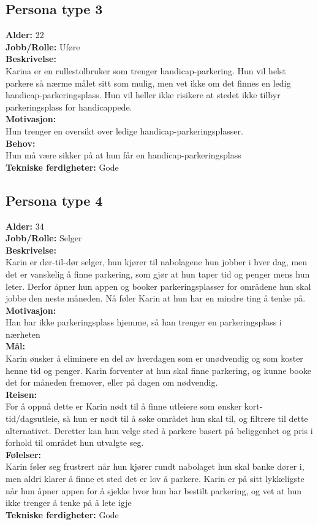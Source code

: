 \documentclass[12pt]{article}
\begin{document}
    \subsection{Persona type 3}
    \textbf{Alder:} 22\\
    \textbf{Jobb/Rolle:} Uføre\\
    \textbf{Beskrivelse:}\\
    Karina er en rullestolbruker som trenger handicap-parkering. Hun vil helst parkere så nærme målet sitt som mulig, men vet ikke om det finnes en ledig handicap-parkeringsplass. Hun vil heller ikke risikere at stedet ikke tilbyr parkeringsplass for handicappede.\\
    \textbf{Motivasjon:}\\
    Hun trenger en oversikt over ledige handicap-parkeringsplasser.\\
    \textbf{Behov:}\\
    Hun må være sikker på at hun får en handicap-parkeringsplass\\
    \textbf{Tekniske ferdigheter:} Gode

    \subsection{Persona type 4}
    \textbf{Alder:} 34 \\
    \textbf{Jobb/Rolle:} Selger\\
    \textbf{Beskrivelse:}\\
    Karin er dør-til-dør selger, hun kjører til nabolagene hun jobber i hver dag, men det er vanskelig å finne parkering, som gjør at hun taper tid og penger mens hun leter. Derfor åpner hun appen og booker parkeringsplasser for områdene hun skal jobbe den neste måneden. Nå føler Karin at hun har en mindre ting å tenke på.\\
    \textbf{Motivasjon:}\\
    Han har ikke parkeringsplass hjemme, så han trenger en parkeringsplass i nærheten\\
    \textbf{Mål:}\\
    Karin ønsker å eliminere en del av hverdagen som er unødvendig og som koster henne tid og penger. Karin forventer at hun skal finne parkering, og kunne booke det for måneden fremover, eller på dagen om nødvendig.\\
    \textbf{Reisen:}\\
    For å oppnå dette er Karin nødt til å finne utleiere som ønsker kort-tid/dagsutleie, så hun er nødt til å søke området hun skal til, og filtrere til dette alternativet. Deretter kan hun velge sted å parkere basert på beliggenhet og pris i forhold til området hun utvalgte seg.\\
    \textbf{Følelser:}\\
    Karin føler seg frustrert når hun kjører rundt nabolaget hun skal banke dører i, men aldri klarer å finne et sted det er lov å parkere. Karin er på sitt lykkeligste når hun åpner appen for å sjekke hvor hun har bestilt parkering, og vet at hun ikke trenger å tenke på å lete igje\\
    \textbf{Tekniske ferdigheter:} Gode
\end{document}

